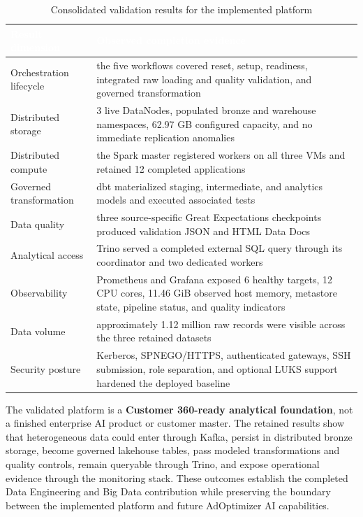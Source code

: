 \begin{table}[!htbp]
    \centering
    \footnotesize
    \renewcommand{\arraystretch}{1.14}
    \begin{tabularx}{\textwidth}{|L{0.31\textwidth}|Y|}
        \hline
        \textcolor{white}{\textbf{Result dimension}} & \textcolor{white}{\textbf{Observed completion evidence}} \\
        \hline
        Orchestration lifecycle & the five workflows covered reset, setup, readiness, integrated raw loading and quality validation, and governed transformation \\
        \hline
        Distributed storage & 3 live DataNodes, populated bronze and warehouse namespaces, 62.97 GB configured capacity, and no immediate replication anomalies \\
        \hline
        Distributed compute & the Spark master registered workers on all three VMs and retained 12 completed applications \\
        \hline
        Governed transformation & dbt materialized staging, intermediate, and analytics models and executed associated tests \\
        \hline
        Data quality & three source-specific Great Expectations checkpoints produced validation JSON and HTML Data Docs \\
        \hline
        Analytical access & Trino served a completed external SQL query through its coordinator and two dedicated workers \\
        \hline
        Observability & Prometheus and Grafana exposed 6 healthy targets, 12 CPU cores, 11.46 GiB observed host memory, metastore state, pipeline status, and quality indicators \\
        \hline
        Data volume & approximately 1.12 million raw records were visible across the three retained datasets \\
        \hline
        Security posture & Kerberos, SPNEGO/HTTPS, authenticated gateways, SSH submission, role separation, and optional LUKS support hardened the deployed baseline \\
        \hline
    \end{tabularx}
    \caption{Consolidated validation results for the implemented platform}
    \label{tab:chapter8-final-results-summary}
\end{table}
\FloatBarrier

The validated platform is a \textbf{Customer 360-ready analytical foundation}, not a finished enterprise AI product or customer master. The retained results show that heterogeneous data could enter through Kafka, persist in distributed bronze storage, become governed lakehouse tables, pass modeled transformations and quality controls, remain queryable through Trino, and expose operational evidence through the monitoring stack. These outcomes establish the completed Data Engineering and Big Data contribution while preserving the boundary between the implemented platform and future AdOptimizer AI capabilities.

